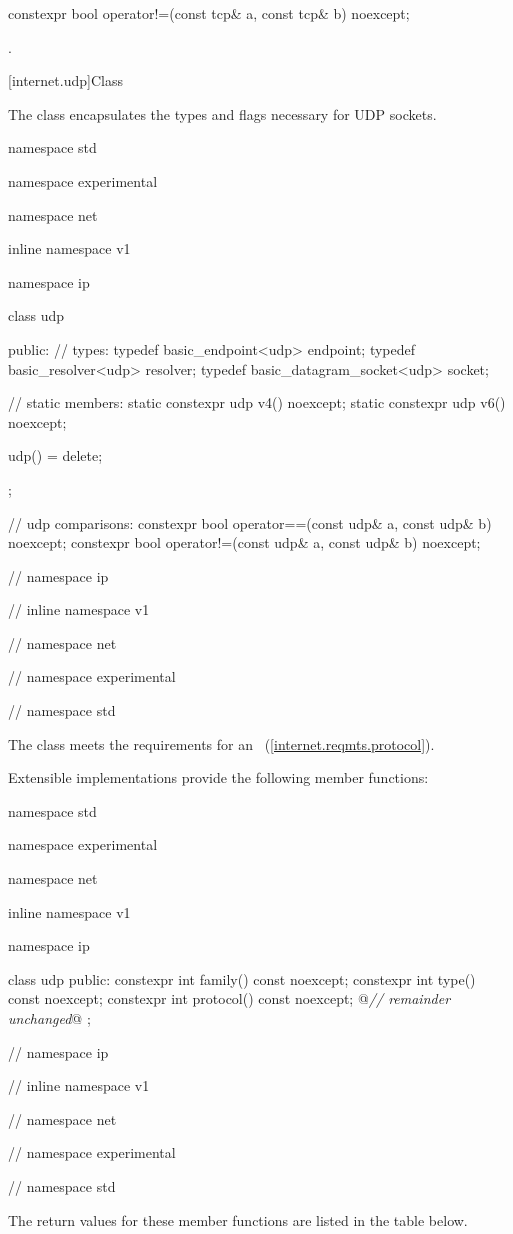 \begin{itemdecl}
constexpr bool operator!=(const tcp& a, const tcp& b) noexcept;
\end{itemdecl}

\begin{itemdescr}
\pnum
\returns {}.
\end{itemdescr}




[internet.udp]{Class }

\pnum
The class  encapsulates the types and flags necessary for UDP sockets.

\begin{codeblock}
namespace std {
namespace experimental {
namespace net {
inline namespace v1 {
namespace ip {

  class udp
  {
  public:
    // types:
    typedef basic_endpoint<udp> endpoint;
    typedef basic_resolver<udp> resolver;
    typedef basic_datagram_socket<udp> socket;

    // static members:
    static constexpr udp v4() noexcept;
    static constexpr udp v6() noexcept;

    udp() = delete;
  };

  // udp comparisons:
  constexpr bool operator==(const udp& a, const udp& b) noexcept;
  constexpr bool operator!=(const udp& a, const udp& b) noexcept;

} // namespace ip
} // inline namespace v1
} // namespace net
} // namespace experimental
} // namespace std
\end{codeblock}

\pnum
The  class meets the requirements for an ~(\ref{internet.reqmts.protocol}).

\pnum
 Extensible implementations provide the following member functions:

\begin{codeblock}
namespace std {
namespace experimental {
namespace net {
inline namespace v1 {
namespace ip {

  class udp
  {
  public:
    constexpr int family() const noexcept;
    constexpr int type() const noexcept;
    constexpr int protocol() const noexcept;
    @\textit{// remainder unchanged}@
  };

} // namespace ip
} // inline namespace v1
} // namespace net
} // namespace experimental
} // namespace std
\end{codeblock}

\pnum
 The return values for these member functions are listed in the table below.

